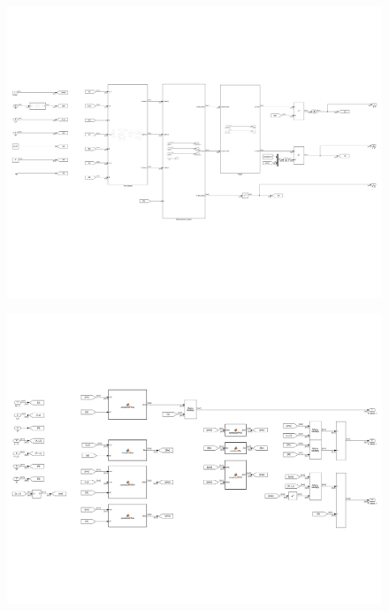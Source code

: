\begin{figure}[H]
    \centering
    \captionsetup{ justification = centering }
    \includegraphics[trim={0cm 5cm 0cm 4cm},clip,width = 15cm]{Images/PS7/kalmanFilter-01.png}
\end{figure}

\begin{figure}[H]
    \centering
    \captionsetup{ justification = centering }
    \includegraphics[trim={0cm 2cm 0cm 3cm},clip,width = 15cm]{Images/PS7/kalmanFilter-04.png}
\end{figure}

